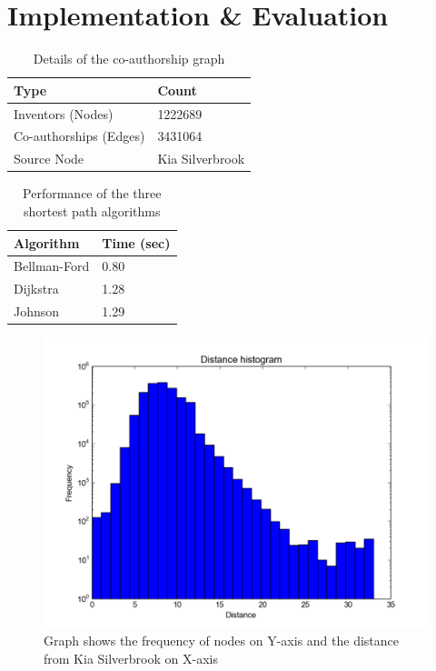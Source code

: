 \section{Implementation \& Evaluation}
\label{sec:eval}

\begin{table}
		\begin{tabular}{| l | l |}
		\hline
		
		{Type} & {Count} \\
		\hline
		\hline
		Inventors (Nodes) & 1222689 \\
		Co-authorships (Edges) & 3431064 \\
		Source Node & Kia Silverbrook\\
		\hline
	\end{tabular}		
	\caption {\scriptsize Details of the co-authorship graph}
	\label{tab:model}
\end{table}	

\begin{table}	
	\begin{tabular}{| l | l |}
		\hline
		{Algorithm} & {Time (sec)} \\
		\hline
		\hline
		Bellman-Ford & 0.80 \\
		Dijkstra & 1.28 \\
		Johnson & 1.29 \\
		\hline
	\end{tabular}
	\caption {\scriptsize Performance of the three shortest path algorithms}
	\label{tab:algos}
\end{table}					

\begin{figure}
  \includegraphics[scale=0.425]{figure/silver_brook_distance.pdf}
  \caption{\scriptsize Graph shows the frequency of nodes on Y-axis and the distance from
Kia Silverbrook on X-axis }
\label{fig:distance}
\end{figure}

